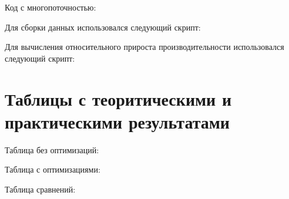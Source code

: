 \documentclass[a4paper, 12pt]{article}
\begin{document}
Код с многопоточностью:

\vspace{0.5cm}

Для сборки данных использовался следующий скрипт:

\vspace{0.5cm}

Для вычисления относительного прироста производительности использовался следующий скрипт:

\vspace{0.5cm}

\section{Таблицы с теоритическими и практическими результатами}

Таблица без оптимизаций:

\vspace{0.3cm}


\vspace{0.5cm}

Таблица с оптимизациями:

\vspace{0.3cm}


\vspace{0.5cm}

Таблица сравнений:

\vspace{0.3cm}

\end{document}
